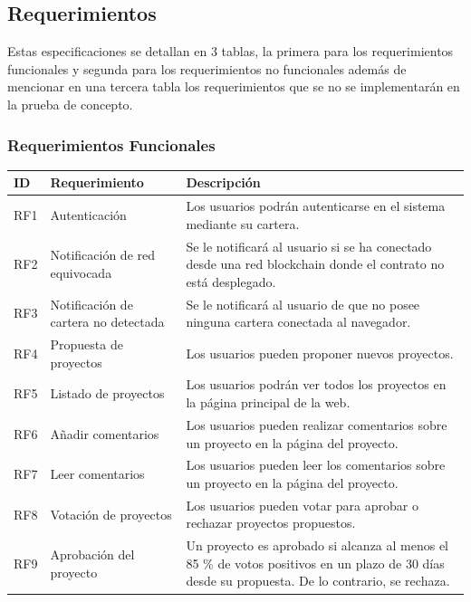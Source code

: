 \subsection{Requerimientos}

Estas especificaciones se detallan en 3 tablas, la primera para los requerimientos funcionales y segunda para los requerimientos no funcionales además de mencionar en una tercera tabla los requerimientos que se no se implementarán en la prueba de concepto.


\subsubsection{Requerimientos Funcionales}

\begin{table}[H]
\centering
\begin{tabular}{|p{1cm}|p{4cm}|p{10cm}|}
\hline
    \textbf{ID} & \textbf{Requerimiento} & \textbf{Descripción} \\
    \hline 
    RF1 & Autenticación & Los usuarios podrán autenticarse en el sistema mediante su cartera. \\
    \hline
    RF2 & Notificación de red equivocada & Se le notificará al usuario si se ha conectado desde una red blockchain donde el contrato no está desplegado. \\
    \hline
    RF3 & Notificación de cartera no detectada & Se le notificará al usuario de que no posee ninguna cartera conectada al navegador. \\
    \hline
    RF4 & Propuesta de proyectos & Los usuarios pueden proponer nuevos proyectos. \\
    \hline 
    RF5 & Listado de proyectos & Los usuarios podrán ver todos los proyectos en la página principal de la web. \\
    \hline
    RF6 & Añadir comentarios & Los usuarios pueden realizar comentarios sobre un proyecto en la página del proyecto. \\
    \hline
    RF7 & Leer comentarios & Los usuarios pueden leer los comentarios sobre un proyecto en la página del proyecto. \\
    \hline
    RF8 & Votación de proyectos & Los usuarios pueden votar para aprobar o rechazar proyectos propuestos. \\
    \hline
    RF9 & Aprobación del proyecto & Un proyecto es aprobado si alcanza al menos el 85 \% de votos positivos en un plazo de 30 días desde su propuesta. De lo contrario, se rechaza. \\

\end{tabular}
\end{table}
